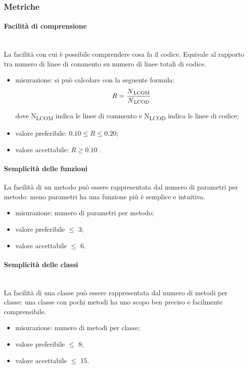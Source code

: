 		\subsubsection{Metriche}
			\paragraph{Facilità di comprensione}\mbox{}\\
			La facilità con cui è possibile comprendere cosa fa il codice. Equivale al rapporto tra numero di linee di commento su numero di linee totali di codice. %
			\begin{itemize}
			\item misurazione: si può calcolare con la seguente formula: \\
			$$ R = \frac{N\textsubscript{LCOM}}{N\textsubscript{LCOD}}  $$
		
			dove N\textsubscript{LCOM} indica le linee di commento e N\textsubscript{LCOD} indica le linee di codice;
			\item valore preferibile: $0.10 \leq R \leq 0.20$;
			\item valore accettabile: $R \geq 0.10$ .
			\end{itemize}
			\paragraph{Semplicità delle funzioni}
			La facilità di un metodo può essere rappresentata dal numero di parametri per metodo: meno parametri ha una funzione più è semplice e intuitiva.
			\begin{itemize}
			\item misurazione: numero di parametri per metodo;
			\item valore preferibile $\leq$ 3;
			\item valore accettabile $\leq$ 6.
			\end{itemize}
			\paragraph{Semplicità delle classi}\mbox{}\\
			La facilità di una classe può essere rappresentata dal numero di metodi per classe: una classe con pochi metodi ha uno scopo ben preciso e facilmente comprensibile.
			\begin{itemize}
			\item misurazione: numero di metodi per classe;
			\item valore preferibile $\leq$ 8;
			\item valore accettabile $\leq$ 15.
			\end{itemize}
